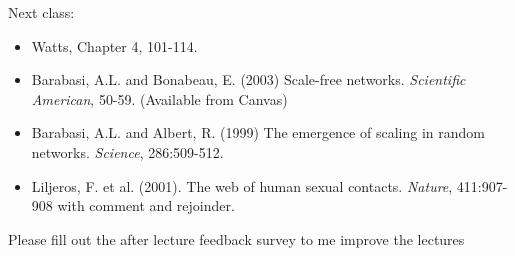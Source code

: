 \documentclass[aspectratio=169]{beamer}
\begin{document}
\begin{frame}

Next class:
\begin{itemize}
\item Watts, Chapter 4, 101-114.
\item Barabasi, A.L. and Bonabeau, E. (2003) Scale-free networks. \textit{Scientific American}, 50-59. (Available from Canvas)
\item Barabasi, A.L. and Albert, R. (1999) The emergence of scaling in random networks. \textit{Science}, 286:509-512.
\item Liljeros, F. et al. (2001). The web of human sexual contacts. \textit{Nature}, 411:907-908 with comment and rejoinder.
\end{itemize}


\end{frame}
\begin{frame}

Please fill out the after lecture feedback survey to me improve the lectures

\end{frame}
\end{document}
